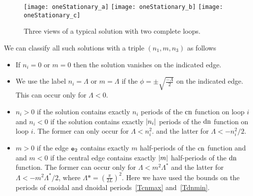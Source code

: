 \documentclass{article}
\numberwithin{equation}{section}
\numberwithin{figure}{section}
\begin{document}
\begin{figure}[htbp] %
   \centering
   \texttt{[image: oneStationary\_a]} 
   \texttt{[image: oneStationary\_b]} 
   \texttt{[image: oneStationary\_c]} 
   \caption{Three views of a typical solution with two complete loops.}
\label{fig:oneStationary}
\end{figure}

We can classify all such solutions with a triple $(n_1,m,n_3)$ as follows
\begin{itemize}
\item If $n_i=0$ or $m=0$ then the solution vanishes on the indicated edge.
%
\item We use the label $n_i=\Lambda$ or $m=\Lambda$ if the $\phi= \pm \sqrt{\frac{-\Lambda}2}$ on the indicated edge. This can occur only for $\Lambda<0$.
%
\item $n_i>0$ if the solution contains exactly $n_i$ periods of the $\operatorname{cn}$ function on loop $i$ and  $n_i<0$ if the solution contains exactly $\left\lvert n_i\right\rvert$ periods of the $\operatorname{dn}$ function on loop $i$. The former can only occur for $\Lambda< n_i^2$. and the latter for $\Lambda< -n_i^2/2$. 
%
\item $m>0$ if the edge $\mathtt{e}_2$ contains exactly $m$ half-periods of the $\operatorname{cn}$ function and and $m<0$ if the central edge contains exactly $\left\lvert m\right\rvert$ half-periods of the $\operatorname{dn}$ function. The former can occur only for $\Lambda<m^2 \Lambda^*$ and the latter for $\Lambda<-m^2 \Lambda^*/2$, where $\Lambda*={\left(\frac{\pi}{2L}\right)}^2$. Here we have used the bounds on the periods of cnoidal and dnoidal periods~\eqref{Tcnmax} and~\eqref{Tdnmin}.
%
\end{itemize}
\end{document}
